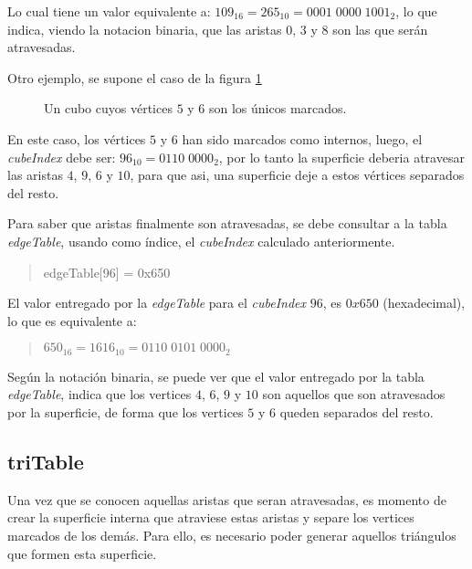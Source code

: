 Lo cual tiene un valor equivalente a: $109_{16} = 265_{10} = 0001 \; 0000 \; 1001_{2}$, lo que indica, viendo la notacion binaria, que las aristas $0$, $3$ y $8$ son las que serán atravesadas.

Otro ejemplo, se supone el caso de la figura \ref{f:ch:implementacion:sec:CubeIndex:edgeTable:example}

\begin{figure}[hbt]
	\makebox[\textwidth]{\framebox[0.3\textwidth]{\rule{0pt}{0.2\textwidth}}}
	\caption{Un cubo cuyos vértices $5$ y $6$ son los únicos marcados.}
	\label{f:ch:implementacion:sec:CubeIndex:edgeTable:example}
\end{figure}

En este caso, los vértices $5$ y $6$ han sido marcados como internos, luego, el \emph{cubeIndex} debe ser: $96_{10} = 0110 \; 0000_{2}$, por lo tanto la superficie deberia atravesar las aristas $4$, $9$, $6$ y $10$, para que asi, una superficie deje a estos vértices separados del resto.

Para saber que aristas finalmente son atravesadas, se debe consultar a la tabla \emph{edgeTable}, usando como índice, el \emph{cubeIndex} calculado anteriormente.

\begin{quote}
	edgeTable[96] = 0x650
\end{quote}

El valor entregado por la \emph{edgeTable} para el \emph{cubeIndex} $96$, es $0x650$ (hexadecimal), lo que es equivalente a:

\begin{quote}
	$650_{16} = 1616_{10} = 0110 \; 0101 \; 0000_{2}$
\end{quote}

Según la notación binaria, se puede ver que el valor entregado por la tabla \emph{edgeTable}, indica que los vertices $4$, $6$, $9$ y $10$ son aquellos que son atravesados por la superficie, de forma que los vertices $5$ y $6$ queden separados del resto.

\subsection{triTable}
\label{ch:implementacion:sec:triTable}

Una vez que se conocen aquellas aristas que seran atravesadas, es momento de crear la superficie interna que atraviese estas aristas y separe los vertices marcados de los demás. Para ello, es necesario poder generar aquellos triángulos que formen esta superficie.

